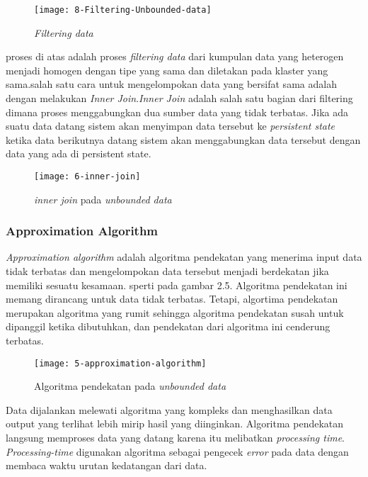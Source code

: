 	\begin{figure}[H] 
	\centering  
	\texttt{[image: 8-Filtering-Unbounded-data]}  
	\caption[Gambar {\it Filtering-unbounded-data}]{\textit{Filtering data}} 
	\label{fig:processing-events relationship} 
	\end{figure} 
	
	proses di atas adalah proses \textit{filtering data} dari kumpulan data yang
	heterogen menjadi homogen dengan tipe yang sama dan diletakan pada klaster yang sama.salah
	satu cara untuk mengelompokan data yang bersifat sama adalah dengan melakukan \textit{Inner 
	Join}.\textit{Inner Join} adalah salah satu bagian dari filtering dimana proses menggabungkan 
	dua sumber data yang tidak terbatas. Jika ada suatu data datang sistem akan menyimpan data 
	tersebut ke \textit{persistent state} ketika data berikutnya datang sistem akan 
	menggabungkan data tersebut dengan data yang ada di persistent state.
	
	\begin{figure}[H] 
	\centering  
	\texttt{[image: 6-inner-join]}  
	\caption[Gambar {\it inner-join}]{\textit{inner join} pada \textit{unbounded data}} 
		\label{fig:processing-events relationship} 
		\end{figure} 
	
	
	\subsubsection{Approximation Algorithm}
	\textit{Approximation algorithm} adalah algoritma pendekatan yang menerima input data tidak 
	terbatas dan mengelompokan data tersebut menjadi berdekatan jika memiliki sesuatu kesamaan. 
	sperti pada gambar 2.5. 
	Algoritma pendekatan ini memang dirancang untuk data tidak terbatas. Tetapi, 
	algortima pendekatan merupakan algoritma yang rumit sehingga algoritma pendekatan susah 
	untuk dipanggil ketika dibutuhkan, dan pendekatan dari algoritma ini cenderung terbatas. 
	
	\begin{figure}[H] 
	\centering  
	\texttt{[image: 5-approximation-algorithm]}  
	\caption[Gambar {\it approximation-algorithm}]{Algoritma pendekatan pada \textit{unbounded 		
	data}} 
	\label{fig:processing-events relationship} 
	\end{figure} 
	
	Data dijalankan melewati algoritma yang kompleks dan menghasilkan data output yang 		
	terlihat lebih mirip hasil yang diinginkan. Algoritma pendekatan langsung memproses data yang 
	datang karena itu melibatkan \textit{processing time}. \textit{Processing-time} digunakan 
	algoritma sebagai pengecek  \textit{error} pada data dengan membaca waktu urutan kedatangan 
	dari data.
	
